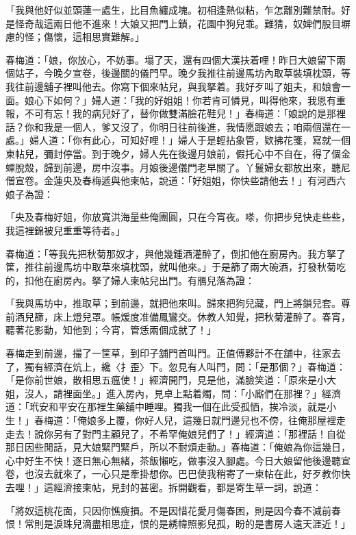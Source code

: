「我與他好似並頭蓮一處生，比目魚纏成塊。初相逢熱似粘，乍怎離別難禁耐。好是怪奇哉這兩日他不進來！大娘又把門上鎖，花園中狗兒乖。難猜，奴婢們股目塀慮的怪；傷懷，這相思實難解。」

春梅道：「娘，你放心，不妨事。塌了天，還有四個大漢扶着哩！昨日大娘留下兩個姑子，今晚夕宣卷，後邊關的儀門早。晚夕我推往前邊馬坊內取草裝填枕頭，等我往前邊舖子裡叫他去。你寫下個來帖兒，與我拏着。我好歹叫了姐夫，和娘會一面。娘心下如何？」婦人道：「我的好姐姐！你若肯可憐見，叫得他來，我恩有重報，不可有忘！我的病兒好了，替你做雙滿臉花鞋兒！」春梅道：「娘說的是那裡話？你和我是一個人，爹又沒了，你明日往前後進，我情愿跟娘去；咱兩個還在一處。」婦人道：「你有此心，可知好哩！」婦人于是輕拈象管，欵拂花箋，寫就一個柬帖兒，彌封停當。到于晚夕，婦人先在後邊月娘前，假托心中不自在，得了個金蟬脫殼，歸到前邊，房中沒事。月娘後邊儀門老早關了。丫鬟婦女都放出來，聽尼僧宣卷。金蓮央及春梅遞與他柬帖，說道：「好姐姐，你快些請他去！」有河西六娘子為證：

「央及春梅好姐，你放寬洪海量些俺團圓，只在今宵夜。嗏，你把步兒快走些些，我這裡錦被兒重重等待者。」

春梅道：「等我先把秋菊那奴才，與他幾鍾酒灌醉了，倒扣他在廚房內。我方拏了筐，推往前邊馬坊中取草來填枕頭，就叫他來。」于是篩了兩大碗酒，打發秋菊吃的，扣他在廚房內。拏了婦人柬帖兒出門。有鴈兒落為證：

「我與馬坊中，推取草；到前邊，就把他來叫。歸來把狗兒藏，門上將鎖兒套。尊前酒兒篩，床上燈兒罩。帳煖度准備鳳鸞交。休教人知覺，把秋菊灌醉了。春宵，聽著花影動，知他到；今宵，管恁兩個成就了！」

春梅走到前邊，撮了一筐草，到印子舖門首叫門。正值傅夥計不在舖中，往家去了，獨有經濟在炕上，纔〈扌歪〉下。忽見有人叫門，問：「是那個？」春梅道：「是你前世娘，散相思五瘟使！」經濟開門，見是他，滿臉笑道：「原來是小大姐，沒人，請裡面坐。」進入房內，見卓上點着燭，問：「小廝們在那裡？」經濟道：「玳安和平安在那裡生藥舖中睡哩。獨我一個在此受孤恓，挨冷淡，就是小生！」春梅道：「俺娘多上覆，你好人兒，這幾日就門邊兒也不傍，往俺那屋裡走走去！說你另有了對門主顧兒了，不希罕俺娘兒們了！」經濟道：「那裡話！自從那日因些閒話，見大娘緊門緊戶，所以不耐煩走動。」春梅道：「俺娘為你這幾日，心中好生不快！逐日無心無緒，茶飯懶吃，做事沒入腳處。今日大娘留他後邊聽宣卷，也沒去就來了，一心只是牽掛想你。巴巴使我稍寄了一柬帖在此，好歹教你快去哩！」這經濟接柬帖，見封的甚密。拆開觀看，都是寄生草一詞，說道：

「將奴這桃花面，只因你憔瘦損。不是因惜花愛月傷春困，則是因今春不減前春恨！常則是淚珠兒滴盡相思症，恨的是綉幃照影兒孤，盼的是書房人遠天涯近！」

